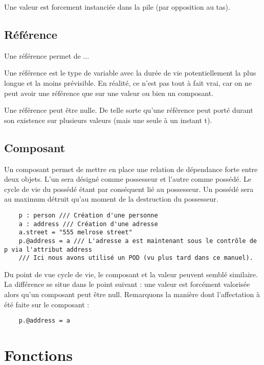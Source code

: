 \documentclass{report}
\begin{document}
Une valeur est forcement instanciée dans la pile (par opposition au tas).

\section{Référence}

Une référence permet de ...

Une référence est le type de variable avec la durée de vie potentiellement la plus longue 
et la moins prévisible. En réalité, ce n'est pas tout à fait vrai, car on ne peut avoir une 
référence que sur une valeur ou bien un composant. 

Une référence peut être nulle. De telle sorte qu'une référence peut porté durant son existence sur
plusieurs valeurs (mais une seule à un instant t).

\section{Composant}

Un composant permet de mettre en place une relation de dépendance forte entre deux objets. 
L'un sera désigné comme possesseur et l'autre comme possédé. Le cycle de vie du possédé étant
par conséquent lié au possesseur. Un possédé sera au maximum détruit qu'au moment de la destruction
du possesseur.

\begin{verbatim}
    p : person /// Création d'une personne
    a : address /// Création d'une adresse
    a.street = "555 melrose street"
    p.@address = a /// L'adresse a est maintenant sous le contrôle de p via l'attribut address
    /// Ici nous avons utilisé un POD (vu plus tard dans ce manuel). 
\end{verbatim} 

Du point de vue cycle de vie, le composant et la valeur peuvent semblé similaire. La différence
se situe dans le point suivant : une valeur est forcément valorisée alors qu'un composant peut être
null. 
Remarquons la manière dont l'affectation à été faite sur le composant :

\begin{verbatim}
    p.@address = a 
\end{verbatim} 








\chapter{Fonctions}
\end{document}
